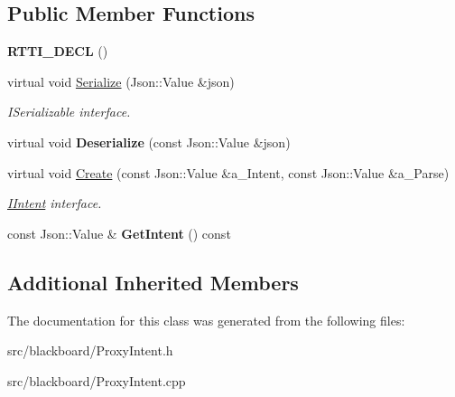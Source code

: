 \subsection*{Public Member Functions}
\begin{DoxyCompactItemize}
\item 
\mbox{\label{class_proxy_intent_a067da874630119a959be561fcd7e6538}} 
{\bfseries R\+T\+T\+I\+\_\+\+D\+E\+CL} ()
\item 
\mbox{\label{class_proxy_intent_a7a74d5e6bcc24c3336e9601419a31bda}} 
virtual void \hyperlink{class_proxy_intent_a7a74d5e6bcc24c3336e9601419a31bda}{Serialize} (Json\+::\+Value \&json)
\begin{DoxyCompactList}\small\item\em I\+Serializable interface. \end{DoxyCompactList}\item 
\mbox{\label{class_proxy_intent_a4333fd52ceb16601056178ef79f382c4}} 
virtual void {\bfseries Deserialize} (const Json\+::\+Value \&json)
\item 
\mbox{\label{class_proxy_intent_a807ef4db7e8f3f1bf1d92d5f014874ef}} 
virtual void \hyperlink{class_proxy_intent_a807ef4db7e8f3f1bf1d92d5f014874ef}{Create} (const Json\+::\+Value \&a\+\_\+\+Intent, const Json\+::\+Value \&a\+\_\+\+Parse)
\begin{DoxyCompactList}\small\item\em \hyperlink{class_i_intent}{I\+Intent} interface. \end{DoxyCompactList}\item 
\mbox{\label{class_proxy_intent_a6ba4141458c7988d2c52090e453c8f8e}} 
const Json\+::\+Value \& {\bfseries Get\+Intent} () const
\end{DoxyCompactItemize}
\subsection*{Additional Inherited Members}


The documentation for this class was generated from the following files\+:\begin{DoxyCompactItemize}
\item 
src/blackboard/Proxy\+Intent.\+h\item 
src/blackboard/Proxy\+Intent.\+cpp\end{DoxyCompactItemize}
